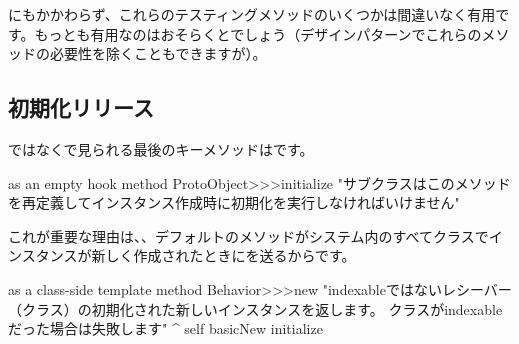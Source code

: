 \documentclass[a4paper,10pt,twoside]{book}
\begin{document}
にもかかわらず、これらのテスティングメソッドのいくつかは間違いなく有用です。もっとも有用なのはおそらくとでしょう（\cite{Wool98a}デザインパターンでこれらのメソッドの必要性を除くこともできますが）。


\subsection{初期化リリース}

ではなくで見られる最後のキーメソッドはです。

\begin{method}{ as an empty hook method}
ProtoObject>>>initialize
   "サブクラスはこのメソッドを再定義してインスタンス作成時に初期化を実行しなければいけません"
\end{method}

これが重要な理由は、、デフォルトのメソッドがシステム内のすべてクラスでインスタンスが新しく作成されたときにを送るからです。

\begin{method}{ as a class-side template method}
Behavior>>>new
    "indexableではないレシーバー（クラス）の初期化された新しいインスタンスを返します。
    クラスがindexableだった場合は失敗します"
    ^ self basicNew initialize
\end{method}
\end{document}
